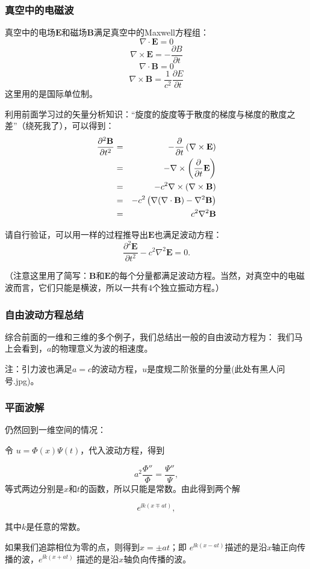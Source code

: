 \documentclass[CJK]{beamer}
\begin{document}
\begin{frame}
  \frametitle{真空中的电磁波}
  真空中的电场$\mathbf{E}$和磁场$\mathbf{B}$满足真空中的Maxwell方程组：
  $$\nabla\cdot\mathbf{E} = 0 $$
  $$\nabla\times \mathbf{E} = -\frac{\partial B}{\partial t}$$
  $$\nabla\cdot\mathbf{B} = 0 $$  
  $$\nabla\times \mathbf{B} = \frac{1}{c^2}\frac{\partial E}{\partial t}$$
  这里用的是国际单位制。
\end{frame}

\begin{frame}
  利用前面学习过的矢量分析知识：“旋度的旋度等于散度的梯度与梯度的散度之差”（绕死我了），可以得到：
  \begin{eqnarray}
    \frac{\partial^2 \mathbf{B}}{\partial t^2}
    &=& -\frac{\partial}{\partial t}\left(\nabla\times\mathbf{E}\right) \nonumber \\
    &=& -\nabla\times\left(\frac{\partial}{\partial t}\mathbf{E}\right) \nonumber \\     
    &=& -c^2\nabla\times(\nabla\times \mathbf{B}) \nonumber \\
    &=& -c^2\left(\nabla(\nabla\cdot\mathbf{B}) -\nabla^2\mathbf{B}\right) \nonumber \\
    &=& c^2\nabla^2\mathbf{B}\nonumber
  \end{eqnarray}

  请自行验证，可以用一样的过程推导出$\mathbf{E}$也满足波动方程：
  $$\frac{\partial^2 \mathbf{E}}{\partial t^2}-c^2\nabla^2\mathbf{E}=0.$$

  （注意这里用了简写：$\mathbf{B}$和$\mathbf{E}$的每个分量都满足波动方程。当然，对真空中的电磁波而言，它们只能是横波，所以一共有4个独立振动方程。）
\end{frame}


\begin{frame}
\frametitle{自由波动方程总结}

综合前面的一维和三维的多个例子，我们总结出一般的自由波动方程为：
我们马上会看到，$a$的物理意义为波的相速度。

\skiplines

{\scriptsize 注：引力波也满足$a=c$的波动方程，$u$是度规二阶张量的分量(此处有黑人问号.jpg)。}


\end{frame}


\begin{frame}
\frametitle{平面波解}
仍然回到一维空间的情况：

令 $u = \Phi(x)\Psi(t)$，代入波动方程，得到

$$ a^2\frac{\Phi'' }{\Phi} =  \frac{\Psi''}{\Psi}, $$
等式两边分别是$x$和$t$的函数，所以只能是常数。由此得到两个解

$$ e^{\ii k(x\mp at)}, $$

其中$k$是任意的常数。

如果我们追踪相位为零的点，则得到$x = \pm at$；即 $e^{\ii k(x - at)}$描述的是沿$x$轴正向传播的波，$e^{\ii k(x + at)}$ 描述的是沿$x$轴负向传播的波。

\end{frame}
\end{document}
